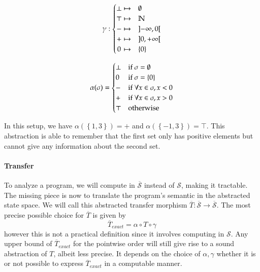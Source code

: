 \documentclass[14pt]{article}
\renewcommand{\S}{\mathcal{S}}
\newcommand{\oS}{\overline{\mathcal{S}}}
\begin{document}
\hfill

\begin{minipage}{0.4\linewidth}
\[
\gamma:
\begin{cases}
\hfill \bot \hfill \mapsto & \emptyset \\
\hfill \top \hfill \mapsto & \mathbb{N} \\
\hfill -   \hfill \mapsto & \left]-\infty,0\right[ \\
\hfill +   \hfill \mapsto & \left]0,+\infty\right[ \\
\hfill 0   \hfill \mapsto & \left\{0\right\} \\
\end{cases}
\]
\end{minipage}
\quad
\begin{minipage}{0.4\linewidth}
\[
\alpha(\sigma) =
\begin{cases}
\bot \hfill & \text{if } \sigma = \emptyset \\
 0   \hfill & \text{if } \sigma = \left\{0\right\} \\
 -   \hfill & \text{if } \forall x\in\sigma, x < 0 \\
 +   \hfill & \text{if } \forall x\in\sigma, x > 0 \\
\top \hfill & \text{otherwise} \\
\end{cases}
\]
\end{minipage}

\hfill

In this setup, we have $\alpha(\left\{1,3\right\}) = +$ and $\alpha(\left\{-1,3\right\}) = \top$. This abstraction is able to remember that the first set only has positive elements but cannot give any information about the second set.

\paragraph{Transfer} To analyze a program, we will compute in $\oS$ instead of $\S$, making it tractable. The missing piece is now to translate the program's semantic in the abstracted state space. We will call this abstracted transfer morphism $\overline{T}:\oS\to\oS$. The most precise possible choice for $\overline{T}$ is given by
\[ \overline{T}_{exact} = \alpha\circ T\circ \gamma \]
however this is not a practical definition since it involves computing in $\S$. Any upper bound of $\overline{T}_{exact}$ for the pointwise order will still give rise to a sound abstraction of $T$, albeit less precise. It depends on the choice of $\alpha,\gamma$ whether it is or not possible to express $\overline{T}_{exact}$ in a computable manner.
\end{document}
